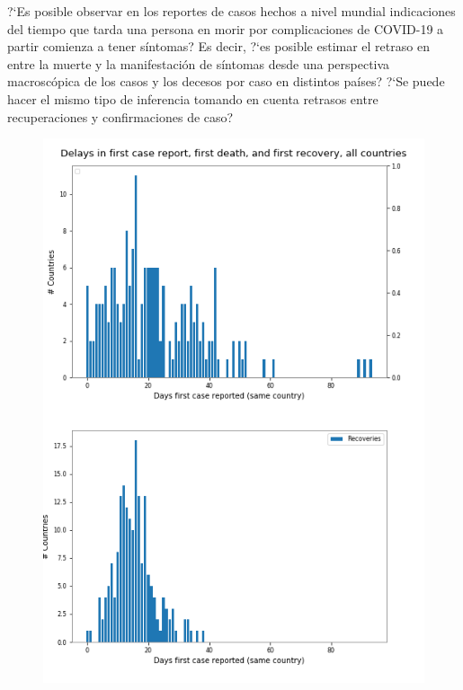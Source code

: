 \documentclass[8pt]{article}
\begin{document}
?`Es posible observar en los reportes de casos hechos a nivel mundial indicaciones del tiempo que tarda una persona en morir por complicaciones de COVID-19 a partir comienza a tener síntomas? Es decir, ?`es posible estimar el retraso en entre la muerte y la manifestación de síntomas desde una perspectiva macroscópica de los casos y los decesos por caso en distintos países? ?`Se puede hacer el mismo tipo de inferencia tomando en cuenta retrasos entre recuperaciones y confirmaciones de caso?


%
\begin{figure}[h]
\begin{minipage}{0.5\textwidth}
\includegraphics[width=\textwidth]{../figures_COVID19_dataAnalysis/dam_COVID19_JHU_delays_AllCountries}
\end{minipage}%
\begin{minipage}{0.5\textwidth}

\end{minipage}
\end{figure}
\end{document}
